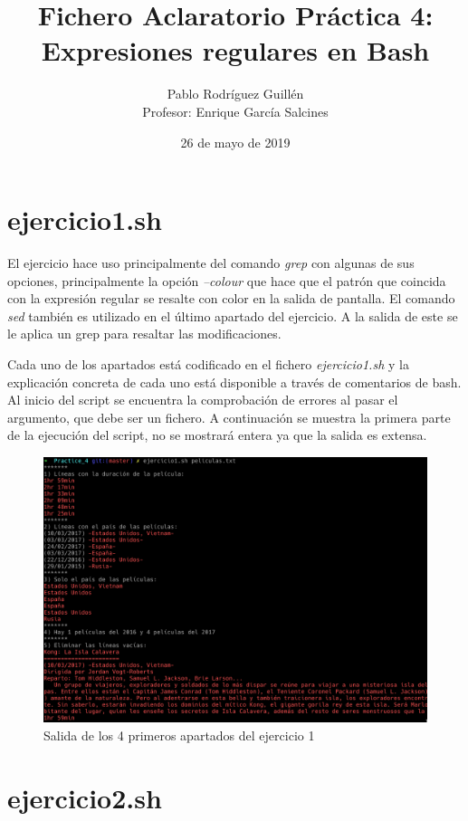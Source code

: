 \documentclass[11pt,a4paper]{article}
\author{Pablo Rodríguez Guillén \\ Profesor: Enrique García Salcines}
\title{\textbf{Fichero Aclaratorio Práctica 4: Expresiones regulares en Bash}}
\date{26 de mayo de 2019}
\begin{document}

\maketitle
\tableofcontents
\newpage

\section{ejercicio1.sh}
El ejercicio hace uso principalmente del comando \emph{grep} con algunas de sus opciones, principalmente la opción \emph{--colour} que hace que el patrón que coincida con la expresión regular se resalte con color en la salida de pantalla. El comando \emph{sed} también es utilizado en el último apartado del ejercicio. A la salida de este se le aplica un grep para resaltar las modificaciones.

Cada uno de los apartados está codificado en el fichero \emph{ejercicio1.sh} y la explicación concreta de cada uno está disponible a través de comentarios de bash. Al inicio del script se encuentra la comprobación de errores al pasar el argumento, que debe ser un fichero. A continuación se muestra la primera parte de la ejecución del script, no se mostrará entera ya que la salida es extensa.

\begin{figure}[ht]
	\includegraphics[width=1\textwidth]{images/ejercicio1.png}
	\caption{Salida de los 4 primeros apartados del ejercicio 1}
\end{figure}

\section{ejercicio2.sh}


% 
% 
\end{document}
